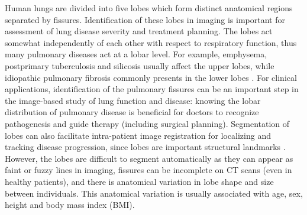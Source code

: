 \documentclass[]{spie}  %
\begin{document}
Human lungs are divided into five lobes which form distinct anatomical regions separated by fissures. Identification of these lobes in imaging is important for assessment of lung disease severity and treatment planning. The lobes act somewhat independently of each other with respect to respiratory function, thus many pulmonary diseases act at a lobar level\cite{ukil2009anatomy}. For example, emphysema, postprimary tuberculosis and silicosis  usually affect the upper lobes, while idiopathic pulmonary fibrosis commonly presents in the lower lobes \cite{lin2015combined}. For clinical applications, identification of the pulmonary fissures can be an important step in the image-based study of lung function and disease: knowing the lobar distribution of pulmonary disease is beneficial for doctors to recognize pathogenesis and guide therapy (including surgical planning)\cite{van2010automatic}. Segmentation of lobes can also facilitate intra-patient image registration for localizing and tracking disease progression, since lobes are important structural landmarks \cite{lassen2011interactive}. However, the lobes are difficult to segment automatically as they can appear as faint or fuzzy lines in imaging, fissures can be incomplete on CT scans (even in healthy patients), and there is anatomical variation in lobe shape and size between individuals. This anatomical variation is usually associated with age, sex, height and body mass index (BMI)\cite{ross2010automatic}. 
\end{document}
